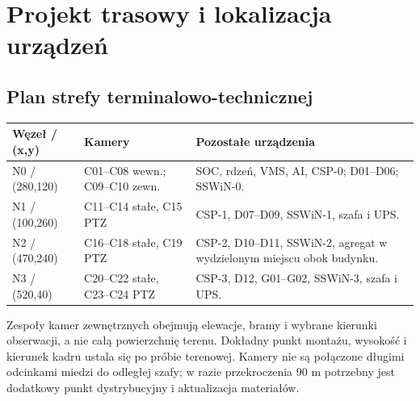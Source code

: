 \section{Projekt trasowy i lokalizacja urządzeń}
\subsection{Plan strefy terminalowo-technicznej}
\begin{tabularx}{\linewidth}{@{}P{25mm}P{38mm}Y@{}}
\toprule\textbf{Węzeł / (x,y)} & \textbf{Kamery} & \textbf{Pozostałe urządzenia}\\\midrule
N0 / (280,120) & C01--C08 wewn.; C09--C10 zewn. & SOC, rdzeń, VMS, AI, CSP-0; D01--D06; SSWiN-0.\\
N1 / (100,260) & C11--C14 stałe, C15 PTZ & CSP-1, D07--D09, SSWiN-1, szafa i UPS.\\
N2 / (470,240) & C16--C18 stałe, C19 PTZ & CSP-2, D10--D11, SSWiN-2, agregat w wydzielonym miejscu obok budynku.\\
N3 / (520,40) & C20--C22 stałe, C23--C24 PTZ & CSP-3, D12, G01--G02, SSWiN-3, szafa i UPS.\\\bottomrule
\end{tabularx}
Zespoły kamer zewnętrznych obejmują elewacje, bramy i wybrane kierunki obserwacji, a nie całą powierzchnię terenu. Dokładny punkt montażu, wysokość i kierunek kadru ustala się po próbie terenowej. Kamery nie są połączone długimi odcinkami miedzi do odległej szafy; w razie przekroczenia 90 m potrzebny jest dodatkowy punkt dystrybucyjny i aktualizacja materiałów.
